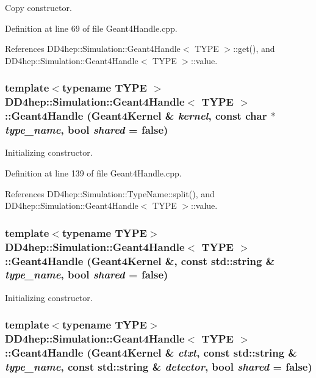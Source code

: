 Copy constructor. 

Definition at line 69 of file Geant4Handle.cpp.

References DD4hep::Simulation::Geant4Handle$<$ TYPE $>$::get(), and DD4hep::Simulation::Geant4Handle$<$ TYPE $>$::value.\hypertarget{class_d_d4hep_1_1_simulation_1_1_geant4_handle_a765cd4c227a41d33781599c71fc11e51}{
\subsubsection[{Geant4Handle}]{\setlength{\rightskip}{0pt plus 5cm}template$<$typename TYPE $>$ {\bf DD4hep::Simulation::Geant4Handle}$<$ TYPE $>$::{\bf Geant4Handle} ({\bf Geant4Kernel} \& {\em kernel}, \/  const char $\ast$ {\em type\_\-name}, \/  bool {\em shared} = {\ttfamily false})}}
\label{class_d_d4hep_1_1_simulation_1_1_geant4_handle_a765cd4c227a41d33781599c71fc11e51}


Initializing constructor. 

Definition at line 139 of file Geant4Handle.cpp.

References DD4hep::Simulation::TypeName::split(), and DD4hep::Simulation::Geant4Handle$<$ TYPE $>$::value.\hypertarget{class_d_d4hep_1_1_simulation_1_1_geant4_handle_ae506e6b636fc035905011c9e5a9012ab}{
\subsubsection[{Geant4Handle}]{\setlength{\rightskip}{0pt plus 5cm}template$<$typename TYPE$>$ {\bf DD4hep::Simulation::Geant4Handle}$<$ TYPE $>$::{\bf Geant4Handle} ({\bf Geant4Kernel} \&, \/  const std::string \& {\em type\_\-name}, \/  bool {\em shared} = {\ttfamily false})}}
\label{class_d_d4hep_1_1_simulation_1_1_geant4_handle_ae506e6b636fc035905011c9e5a9012ab}


Initializing constructor. \hypertarget{class_d_d4hep_1_1_simulation_1_1_geant4_handle_a8a80a9a11de03a890561185f4e45ba18}{
\subsubsection[{Geant4Handle}]{\setlength{\rightskip}{0pt plus 5cm}template$<$typename TYPE$>$ {\bf DD4hep::Simulation::Geant4Handle}$<$ TYPE $>$::{\bf Geant4Handle} ({\bf Geant4Kernel} \& {\em ctxt}, \/  const std::string \& {\em type\_\-name}, \/  const std::string \& {\em detector}, \/  bool {\em shared} = {\ttfamily false})}}
\label{class_d_d4hep_1_1_simulation_1_1_geant4_handle_a8a80a9a11de03a890561185f4e45ba18}



